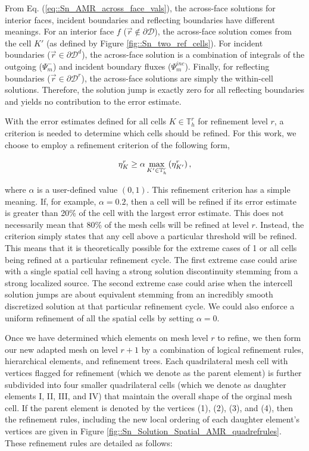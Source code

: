 \noindent From Eq. (\ref{eq::Sn_AMR_across_face_vals}), the across-face solutions for interior faces, incident boundaries and reflecting boundaries have different meanings. For an interior face $f$ ($\vec{r} \notin \partial \mathcal{D}$), the across-face solution comes from the cell $K'$ (as defined by Figure \ref{fig::Sn_two_ref_cells}). For incident boundaries ($\vec{r} \in \partial \mathcal{D}^d$), the across-face solution is a combination of integrals of the outgoing ($\Psi_m^-$) and incident boundary fluxes ($\Psi_m^{inc}$). Finally, for reflecting boundaries ($\vec{r} \in \partial \mathcal{D}^r$), the across-face solutions are simply the within-cell solutions. Therefore, the solution jump is exactly zero for all reflecting boundaries and yields no contribution to the error estimate.

With the error estimates defined for all cells $K \in \mathbb{T}_h^r$ for refinement level $r$, a criterion is needed to determine which cells should be refined. For this work, we choose to employ a refinement criterion of the following form,

\begin{equation}
\label{eq::Sn_AMR_err_crit}
\eta_K^r \geq \alpha \max\displaylimits_{K' \in \mathbb{T}_h^r} \left(  \eta_{K'}^{r} \right),
\end{equation}

\noindent where $\alpha$ is a user-defined value $(0,1)$. This refinement criterion has a simple meaning. If, for example, $\alpha = 0.2$, then a cell will be refined if its error estimate is greater than 20\% of the cell with the largest error estimate. This does not necessarily mean that 80\% of the mesh cells will be refined at level $r$. Instead, the criterion simply states that any cell above a particular threshold will be refined. This means that it is theoretically possible for the extreme cases of 1 or all cells being refined at a particular refinement cycle. The first extreme case could arise with a single spatial cell having a strong solution discontinuity stemming from a strong localized source. The second extreme case could arise when the intercell solution jumps are about equivalent stemming from an incredibly smooth discretized solution at that particular refinement cycle. We could also enforce a uniform refinement of all the spatial cells by setting $\alpha=0$.

Once we have determined which elements on mesh level $r$ to refine, we then form our new adapted mesh on level $r+1$ by a combination of logical refinement rules, hierarchical elements, and refinement trees. Each quadrilateral mesh cell with vertices flagged for refinement (which we denote as the parent element) is further subdivided into four smaller quadrilateral cells (which we denote as daughter elements I, II, III, and IV) that maintain the overall shape of the orginal mesh cell. If the parent element is denoted by the vertices (1), (2), (3), and (4), then the refinement rules, including the new local ordering of each daughter element's vertices are given in Figure \ref{fig::Sn_Solution_Spatial_AMR_quadrefrules}. These refinement rules are detailed as follows:

